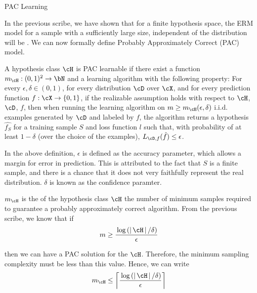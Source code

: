 \documentclass{article}
\begin{document}
\makeheader%

\begin{ssection}{PAC Learning}

	In the previous scribe, we have shown that for a finite hypothesis space, the ERM model for a sample with a sufficiently large size, independent of the distribution will be . We can now formally define Probably Approximately Correct (PAC) model.

	\begin{definition}
		A hypothesis class $\cH$ is PAC learnable if there exist a function $m_\cH : (0, 1)^2 \ra \bN$ and a learning algorithm with the following property: For every $\epsilon, \delta \in (0, 1)$, for every distribution $\cD$ over $\cX$, and for every prediction function $f : \cX \ra \set{0, 1}$, if the realizable assumption holds with respect to $\cH$, $\cD$, $f$, then when running the learning algorithm on $m \ge m_\cH (\epsilon, \delta)$ i.i.d. examples generated by $\cD$ and labeled by $f$, the algorithm returns a hypothesis $\hat{f_S}$ for a training sample $S$ and loss function $l$ such that, with probability of at least $1 - \delta$ (over the choice of the examples), $L_{\cD, f}(\hat{f}) \le \epsilon$.
	\end{definition}

	In the above definition, $\epsilon$ is defined as the accuracy parameter, which allows a margin for error in prediction. This is attributed to the fact that $S$ is a finite sample, and there is a chance that it does not very faithfully represent the real distribution. $\delta$ is known as the confidence paramter. \br

	$m_\cH$ is the  of the hypothesis class $\cH$  the number of minimum samples required to guarantee a probably approximately correct algorithm. From the previous scribe, we know that if
	\begin{equation}
		m \ge \frac{\log{\abs{\cH} / \delta}}{\epsilon}
	\end{equation}

	then we can have a PAC solution for the $\cH$. Therefore, the minimum sampling complexity must be less than this value. Hence, we can write
	\begin{equation}
		m_\cH	\le	\ceil{\frac{\log{\abs{\cH} / \delta}}{\epsilon}}
		\label{eq:sampling-complexity}
	\end{equation}

\end{ssection}
\end{document}
